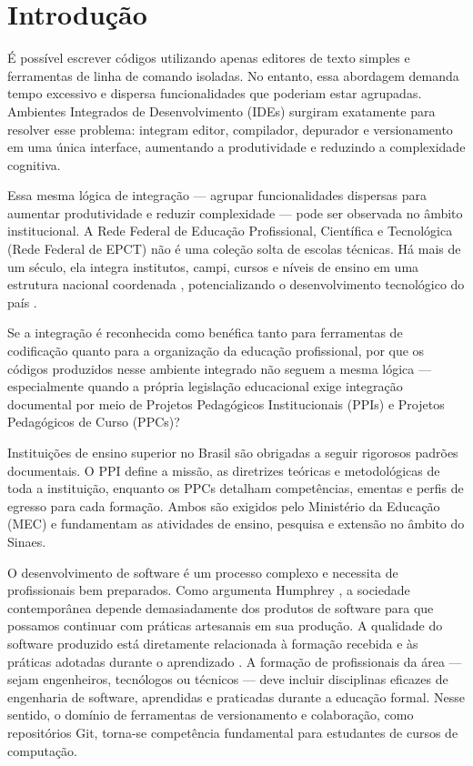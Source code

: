 \documentclass[english, spanish, brazilian]{RBIEarticle}
\begin{document}
\pagebreak


\section{Introdução}
É possível escrever códigos utilizando apenas editores de texto simples e ferramentas de linha de comando isoladas. No entanto, essa abordagem demanda tempo excessivo e dispersa funcionalidades que poderiam estar agrupadas. Ambientes Integrados de Desenvolvimento (IDEs) surgiram exatamente para resolver esse problema: integram editor, compilador, depurador e versionamento em uma única interface, aumentando a produtividade e reduzindo a complexidade cognitiva.

Essa mesma lógica de integração — agrupar funcionalidades dispersas para aumentar produtividade e reduzir complexidade — pode ser observada no âmbito institucional. A Rede Federal de Educação Profissional, Científica e Tecnológica (Rede Federal de EPCT) não é uma coleção solta de escolas técnicas. Há mais de um século, ela integra institutos, campi, cursos e níveis de ensino em uma estrutura nacional coordenada \cite{lei11922_2008}, potencializando o desenvolvimento tecnológico do país \cite{pacheco2011}.

Se a integração é reconhecida como benéfica tanto para ferramentas de codificação quanto para a organização da educação profissional, por que os códigos produzidos nesse ambiente integrado não seguem a mesma lógica — especialmente quando a própria legislação educacional exige integração documental por meio de Projetos Pedagógicos Institucionais (PPIs) e Projetos Pedagógicos de Curso (PPCs)?

Instituições de ensino superior no Brasil são obrigadas a seguir rigorosos padrões documentais. O PPI define a missão, as diretrizes teóricas e metodológicas de toda a instituição, enquanto os PPCs detalham competências, ementas e perfis de egresso para cada formação. Ambos são exigidos pelo Ministério da Educação (MEC) e fundamentam as atividades de ensino, pesquisa e extensão no âmbito do Sinaes.

O desenvolvimento de software é um processo complexo e necessita de profissionais bem preparados. Como argumenta Humphrey \cite{barr2018}, a sociedade contemporânea depende demasiadamente dos produtos de software para que possamos continuar com práticas artesanais em sua produção. A qualidade do software produzido está diretamente relacionada à formação recebida e às práticas adotadas durante o aprendizado \cite{sommerville2011}. A formação de profissionais da área — sejam engenheiros, tecnólogos ou técnicos — deve incluir disciplinas eficazes de engenharia de software, aprendidas e praticadas durante a educação formal. Nesse sentido, o domínio de ferramentas de versionamento e colaboração, como repositórios Git, torna-se competência fundamental para estudantes de cursos de computação.
\end{document}
